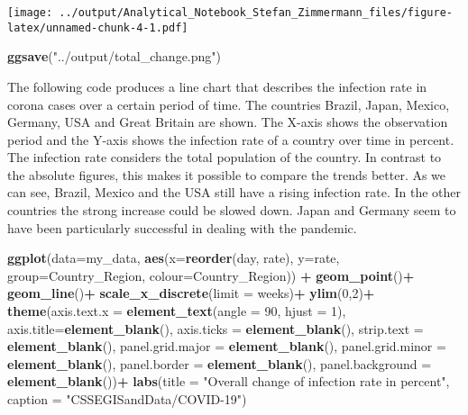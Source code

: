 \documentclass[]{article}
\newenvironment{Shaded}{\begin{snugshade}}{\end{snugshade}}
\newcommand{\DataTypeTok}[1]{\textcolor[rgb]{0.13,0.29,0.53}{#1}}
\newcommand{\DecValTok}[1]{\textcolor[rgb]{0.00,0.00,0.81}{#1}}
\newcommand{\KeywordTok}[1]{\textcolor[rgb]{0.13,0.29,0.53}{\textbf{#1}}}
\newcommand{\NormalTok}[1]{#1}
\newcommand{\OperatorTok}[1]{\textcolor[rgb]{0.81,0.36,0.00}{\textbf{#1}}}
\newcommand{\StringTok}[1]{\textcolor[rgb]{0.31,0.60,0.02}{#1}}
\begin{document}
\texttt{[image: ../output/Analytical\_Notebook\_Stefan\_Zimmermann\_files/figure-latex/unnamed-chunk-4-1.pdf]}

\begin{Shaded}
\begin{Highlighting}[]
\KeywordTok{ggsave}\NormalTok{(}\StringTok{"../output/total_change.png"}\NormalTok{)}
\end{Highlighting}
\end{Shaded}

The following code produces a line chart that describes the infection
rate in corona cases over a certain period of time. The countries
Brazil, Japan, Mexico, Germany, USA and Great Britain are shown. The
X-axis shows the observation period and the Y-axis shows the infection
rate of a country over time in percent. The infection rate considers the
total population of the country. In contrast to the absolute figures,
this makes it possible to compare the trends better. As we can see,
Brazil, Mexico and the USA still have a rising infection rate. In the
other countries the strong increase could be slowed down. Japan and
Germany seem to have been particularly successful in dealing with the
pandemic.

\begin{Shaded}
\begin{Highlighting}[]
\KeywordTok{ggplot}\NormalTok{(}\DataTypeTok{data=}\NormalTok{my_data, }\KeywordTok{aes}\NormalTok{(}\DataTypeTok{x=}\KeywordTok{reorder}\NormalTok{(day, rate), }\DataTypeTok{y=}\NormalTok{rate, }
                         \DataTypeTok{group=}\NormalTok{Country_Region, }\DataTypeTok{colour=}\NormalTok{Country_Region)) }\OperatorTok{+}
\StringTok{  }\KeywordTok{geom_point}\NormalTok{()}\OperatorTok{+}
\StringTok{  }\KeywordTok{geom_line}\NormalTok{()}\OperatorTok{+}
\StringTok{  }\KeywordTok{scale_x_discrete}\NormalTok{(}\DataTypeTok{limit =}\NormalTok{ weeks)}\OperatorTok{+}
\StringTok{  }\KeywordTok{ylim}\NormalTok{(}\DecValTok{0}\NormalTok{,}\DecValTok{2}\NormalTok{)}\OperatorTok{+}
\StringTok{  }\KeywordTok{theme}\NormalTok{(}\DataTypeTok{axis.text.x =} \KeywordTok{element_text}\NormalTok{(}\DataTypeTok{angle =} \DecValTok{90}\NormalTok{, }\DataTypeTok{hjust =} \DecValTok{1}\NormalTok{),}
        \DataTypeTok{axis.title=}\KeywordTok{element_blank}\NormalTok{(),}
        \DataTypeTok{axis.ticks =} \KeywordTok{element_blank}\NormalTok{(),}
        \DataTypeTok{strip.text =} \KeywordTok{element_blank}\NormalTok{(),}
        \DataTypeTok{panel.grid.major =} \KeywordTok{element_blank}\NormalTok{(), }
        \DataTypeTok{panel.grid.minor =} \KeywordTok{element_blank}\NormalTok{(), }
        \DataTypeTok{panel.border =} \KeywordTok{element_blank}\NormalTok{(), }
        \DataTypeTok{panel.background =} \KeywordTok{element_blank}\NormalTok{())}\OperatorTok{+}
\StringTok{ }\KeywordTok{labs}\NormalTok{(}\DataTypeTok{title =}  \StringTok{"Overall change of infection rate in percent"}\NormalTok{,}
       \DataTypeTok{caption =} \StringTok{"CSSEGISandData/COVID-19"}\NormalTok{)}
\end{Highlighting}
\end{Shaded}
\end{document}
